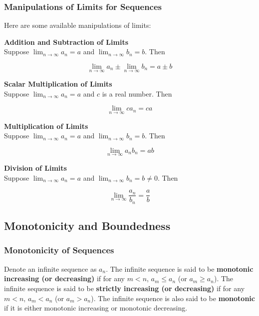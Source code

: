 \subsubsection{Manipulations of Limits for Sequences}
\begin{thm}
  Here are some available manipulations of limits:
  \begin{alist}
   \item \textbf{Addition and Subtraction of Limits}\\
   Suppose $\lim_{n\to \infty}a_{n}=a$ and $\lim_{n\to \infty}b_{n}=b$. Then

   $$\lim_{n\to \infty}a_{n}\pm \lim_{n\to \infty}b_{n}=a\pm b$$

   \item \textbf{Scalar Multiplication of Limits}\\
   Suppose $\lim_{n\to \infty}a_{n}=a$ and $c$ is a real number. Then

   $$\lim_{n\to \infty}ca_{n}=ca$$

   \item \textbf{Multiplication of Limits}\\
   Suppose $\lim_{n\to \infty}a_{n}=a$ and $\lim_{n\to \infty}b_{n}=b$. Then

   $$\lim_{n\to \infty}a_{n}b_{n}=ab$$

   \item \textbf{Division of Limits}\\
   Suppose $\lim_{n\to \infty}a_{n}=a$ and $\lim_{n\to \infty}b_{n}=b\neq 0$. Then

   $$\lim_{n\to \infty}\frac{a_{n}}{b_{n}}=\frac{a}{b}$$
  \end{alist}
\end{thm}

\subsection{Monotonicity and Boundedness}
\subsubsection{Monotonicity of Sequences}
\begin{dft}
  Denote an infinite sequence as $a_{n}$. The infinite sequence is said to be \textbf{monotonic increasing (or decreasing)} if for any $m<n$, $a_{m}\leq a_{n}$ (or $a_{m}\geq a_{n}$). The infinite sequence is said to be \textbf{strictly increasing (or decreasing)} if for any $m<n$, $a_{m}<a_{n}$ (or $a_{m}>a_{n}$). The infinite sequence is also said to be \textbf{monotonic} if it is either monotonic increasing or monotonic decreasing.
\end{dft}

